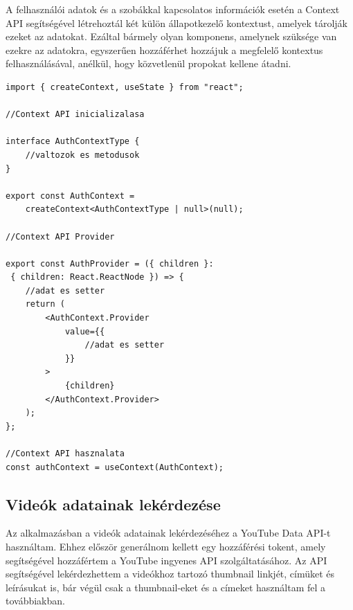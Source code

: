 A felhasználói adatok és a szobákkal kapcsolatos információk esetén a Context API segítségével létrehoztál két külön állapotkezelő kontextust, amelyek tárolják ezeket az adatokat. Ezáltal bármely olyan komponens, amelynek szüksége van ezekre az adatokra, egyszerűen hozzáférhet hozzájuk a megfelelő kontextus felhasználásával, anélkül, hogy közvetlenül propokat kellene átadni.
\\
\begin{lstlisting}[style=Csharp,caption={Context API}]
import { createContext, useState } from "react";

//Context API inicializalasa

interface AuthContextType {
    //valtozok es metodusok
}

export const AuthContext =
    createContext<AuthContextType | null>(null);

//Context API Provider

export const AuthProvider = ({ children }:
 { children: React.ReactNode }) => {
    //adat es setter
    return (
        <AuthContext.Provider
            value={{
                //adat es setter
            }}
        >
            {children}
        </AuthContext.Provider>
    );
};

//Context API hasznalata
const authContext = useContext(AuthContext);
\end{lstlisting}
\vspace{1em}
\subsection*{Videók adatainak lekérdezése}
Az alkalmazásban a videók adatainak lekérdezéséhez a YouTube Data API-t használtam. Ehhez először generálnom kellett egy hozzáférési tokent, amely segítségével hozzáfértem a YouTube ingyenes API szolgáltatásához. Az API segítségével lekérdezhettem a videókhoz tartozó thumbnail linkjét, címüket és leírásukat is, bár végül csak a thumbnail-eket és a címeket használtam fel a továbbiakban.

